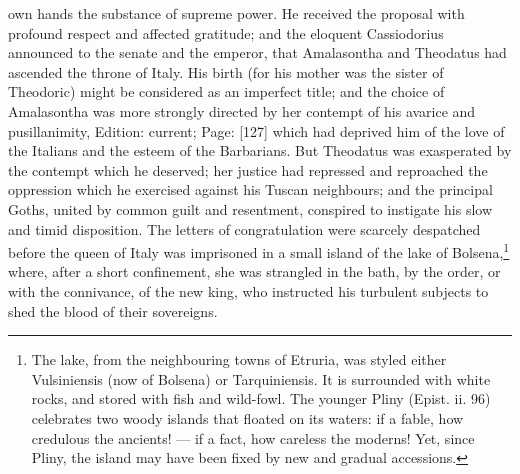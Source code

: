own hands the substance of supreme power. He received the proposal with profound respect and affected gratitude; and the eloquent Cassiodorius announced to the senate and the emperor, that Amalasontha and Theodatus had ascended the throne of Italy. His birth (for his mother was the sister of Theodoric) might be considered as an imperfect title; and the choice of Amalasontha was more strongly directed by her contempt of his avarice and pusillanimity, Edition: current; Page: [127] which had deprived him of the love of the Italians and the esteem of the Barbarians. But Theodatus was exasperated by the contempt which he deserved; her justice had repressed and reproached the oppression which he exercised against his Tuscan neighbours; and the principal Goths, united by common guilt and resentment, conspired to instigate his slow and timid disposition. The letters of congratulation were scarcely despatched before the queen of Italy was imprisoned in a small island of the lake of Bolsena,\footnote{The lake, from the neighbouring towns of Etruria, was styled either Vulsiniensis (now of Bolsena) or Tarquiniensis. It is surrounded with white rocks, and stored with fish and wild-fowl. The younger Pliny (Epist. ii. 96) celebrates two woody islands that floated on its waters: if a fable, how credulous the ancients! \texthebrew{—} if a fact, how careless the moderns! Yet, since Pliny, the island may have been fixed by new and gradual accessions.} where, after a short confinement, she was strangled in the bath, by the order, or with the connivance, of the new king, who instructed his turbulent subjects to shed the blood of their sovereigns.

